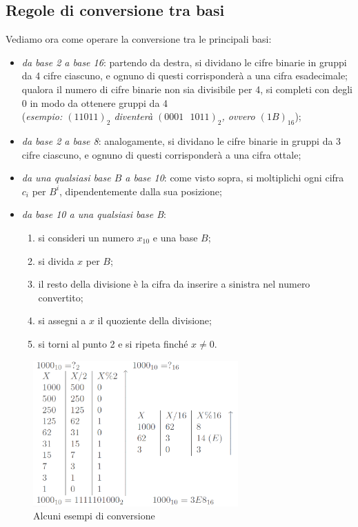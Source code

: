 \documentclass[class=book, crop=false, oneside]{standalone}
\begin{document}
\subsection{Regole di conversione tra basi}
Vediamo ora come operare la conversione tra le principali basi:
\begin{itemize}[noitemsep,nolistsep]
	\item \emph{da base 2 a base 16}: partendo da destra, si dividano le cifre binarie in gruppi da 4 cifre ciascuno, e ognuno di questi corrisponderà a una cifra esadecimale; qualora il numero di cifre binarie non sia divisibile per 4, si completi con degli 0 in modo da ottenere gruppi da 4\\ (\emph{esempio: $(11011)_{2}$ diventerà $(0001\text{ }1011)_{2}$, ovvero $(1B)_{16}$});
	\item \emph{da base 2 a base 8}: analogamente, si dividano le cifre binarie in gruppi da 3 cifre ciascuno, e ognuno di questi corrisponderà a una cifra ottale;
	\item \emph{da una qualsiasi base $B$ a base 10}: come visto sopra, si moltiplichi ogni cifra $c_{i}$ per $B^{i}$, dipendentemente dalla sua posizione;
	\item \emph{da base 10 a una qualsiasi base B}:
	\begin{enumerate}
		\item si consideri un numero $x_{10}$ e una base $B$;
		\item si divida $x$ per $B$;
		\item il resto della divisione è la cifra da inserire a sinistra nel numero convertito;
		\item si assegni a $x$ il quoziente della divisione;
		\item si torni al punto 2 e si ripeta finché $x\neq0$.
	\end{enumerate}
\end{itemize}
\begin{figure}[H]
	\centering
	\includegraphics[width=0.7\textwidth,keepaspectratio]{esempi_conversioni.png}
	\caption{Alcuni esempi di conversione}
\end{figure}
\end{document}
